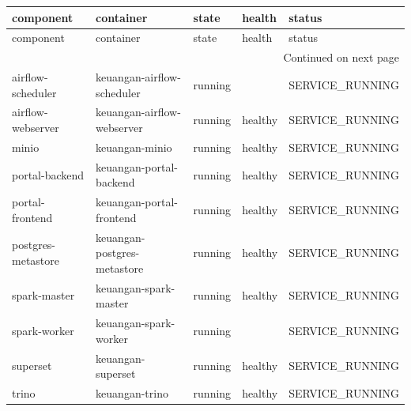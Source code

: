 \begingroup
\scriptsize
\begin{longtable}{lllll}
\toprule
component & container & state & health & status \\
\midrule
\endfirsthead
\toprule
component & container & state & health & status \\
\midrule
\endhead
\midrule
\multicolumn{5}{r}{Continued on next page} \\
\midrule
\endfoot
\bottomrule
\endlastfoot
airflow-scheduler & keuangan-airflow-scheduler & running &  & SERVICE\_RUNNING \\
airflow-webserver & keuangan-airflow-webserver & running & healthy & SERVICE\_RUNNING \\
minio & keuangan-minio & running & healthy & SERVICE\_RUNNING \\
portal-backend & keuangan-portal-backend & running & healthy & SERVICE\_RUNNING \\
portal-frontend & keuangan-portal-frontend & running & healthy & SERVICE\_RUNNING \\
postgres-metastore & keuangan-postgres-metastore & running & healthy & SERVICE\_RUNNING \\
spark-master & keuangan-spark-master & running & healthy & SERVICE\_RUNNING \\
spark-worker & keuangan-spark-worker & running &  & SERVICE\_RUNNING \\
superset & keuangan-superset & running & healthy & SERVICE\_RUNNING \\
trino & keuangan-trino & running & healthy & SERVICE\_RUNNING \\
\end{longtable}
\endgroup
